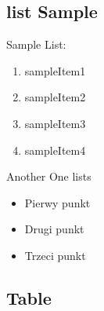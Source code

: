 




\subsection{list Sample}
Sample List:
\begin{enumerate}
     \item sampleItem1
      \item sampleItem2
       \item sampleItem3
        \item sampleItem4
        \label{tab:sampleTable}
\end{enumerate}
Another One lists
\begin{itemize}
  \item Pierwy punkt
  \item Drugi punkt
  \item Trzeci punkt
\end{itemize}
\newpage

\subsection{Table}

 

\newpage
